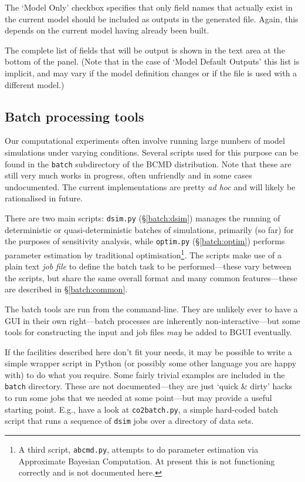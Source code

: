 \documentclass[a4paper,11pt]{article}
\begin{document}
The `Model Only' checkbox specifies that only field names that actually exist in the current model should be included as outputs in the generated file. Again, this depends on the current model having already been built.

The complete list of fields that will be output is shown in the text area at the bottom of the panel. (Note that in the case of `Model Default Outputs' this list is implicit, and may vary if the model definition changes or if the file is used with a different model.)

\subsection{Batch processing tools}\label{batch}

Our computational experiments often involve running large numbers of model simulations under varying conditions. Several scripts used for this purpose can be found in the \texttt{batch} subdirectory of the BCMD distribution. Note that these are still very much works in progress, often unfriendly and in some cases undocumented. The current implementations are pretty \textit{ad hoc} and will likely be rationalised in future.

There are two main scripts: \texttt{dsim.py} (\S\ref{batch:dsim}) manages the running of deterministic or quasi-determ\-inistic batches of simulations, primarily (so far) for the purposes of sensitivity analysis, while \texttt{optim.py} (\S\ref{batch:optim}) performs parameter estimation by traditional optimisation\footnote{A third script, \texttt{abcmd.py}, attempts to do parameter estimation via Approximate Bayesian Computation. At present this is not functioning correctly and is not documented here.}. The scripts make use of a plain text \textit{job file} to define the batch task to be performed---these vary between the scripts, but share the same overall format and many common features---these are described in \S\ref{batch:common}.

The batch tools are run from the command-line. They are unlikely ever to have a GUI in their own right---batch processes are inherently non-interactive---but some tools for constructing the input and job files \textit{may} be added to BGUI eventually.

If the facilities described here don't fit your needs, it may be possible to write a simple wrapper script in Python (or possibly some other language you are happy with) to do what you require. Some fairly trivial examples are included in the \texttt{batch} directory. These are not documented---they are just `quick \& dirty' hacks to run some jobs that we needed at some point---but may provide a useful starting point. E.g., have a look at \texttt{co2batch.py}, a simple hard-coded batch script that runs a sequence of \texttt{dsim} jobs over a directory of data sets.
\end{document}
